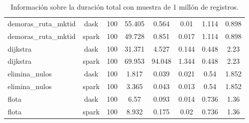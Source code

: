 \begin{table}
{\begin{tabular}{|l|c c c c c c c|}
        demoras\_ruta\_mktid & dask & 100 & 55.405 & 0.564 & 0.01 & 1.114 & 0.898 \\ %
        demoras\_ruta\_mktid & spark & 100 & 49.728 & 0.851 & 0.017 & 1.114 & 0.898 \\ %
        dijkstra & dask & 100 & 31.371 & 4.527 & 0.144 & 0.448 & 2.23 \\ %
        dijkstra & spark & 100 & 69.953 & 94.048 & 1.344 & 0.448 & 2.23 \\ %
        elimina\_nulos & dask & 100 & 1.817 & 0.039 & 0.021 & 0.54 & 1.852 \\ %
        elimina\_nulos & spark & 100 & 3.365 & 0.043 & 0.013 & 0.54 & 1.852 \\ %
        flota & dask & 100 & 6.57 & 0.093 & 0.014 & 0.736 & 1.36 \\ %
        flota & spark & 100 & 8.932 & 0.175 & 0.02 & 0.736 & 1.36 \\ \hline
    \end{tabular}
    \label{table:duracion1M}}
    \caption{Información sobre la duración total con muestra de 1 millón de registros.}
\end{table}


